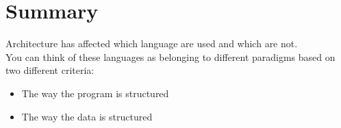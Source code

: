     \section{Summary}
    Architecture has affected which language are used and which are not.\\
    You can think of these languages as belonging to different paradigms based on two different criteria: \begin{itemize}
        \item The way the program is structured
        \item The way the data is structured
    \end{itemize}